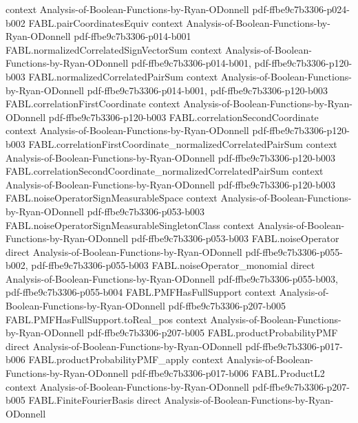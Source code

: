 \begin{theorem}
  {context}
  {Analysis-of-Boolean-Functions-by-Ryan-ODonnell}
  {pdf-ffbe9c7b3306-p024-b002}
\proofstep
  {FABL.pairCoordinatesEquiv}
  {context}
  {Analysis-of-Boolean-Functions-by-Ryan-ODonnell}
  {pdf-ffbe9c7b3306-p014-b001}
\proofstep
  {FABL.normalizedCorrelatedSignVectorSum}
  {context}
  {Analysis-of-Boolean-Functions-by-Ryan-ODonnell}
  {pdf-ffbe9c7b3306-p014-b001,
    pdf-ffbe9c7b3306-p120-b003}
\proofstep
  {FABL.normalizedCorrelatedPairSum}
  {context}
  {Analysis-of-Boolean-Functions-by-Ryan-ODonnell}
  {pdf-ffbe9c7b3306-p014-b001,
    pdf-ffbe9c7b3306-p120-b003}
\proofstep
  {FABL.correlationFirstCoordinate}
  {context}
  {Analysis-of-Boolean-Functions-by-Ryan-ODonnell}
  {pdf-ffbe9c7b3306-p120-b003}
\proofstep
  {FABL.correlationSecondCoordinate}
  {context}
  {Analysis-of-Boolean-Functions-by-Ryan-ODonnell}
  {pdf-ffbe9c7b3306-p120-b003}
\proofstep
  {FABL.correlationFirstCoordinate_normalizedCorrelatedPairSum}
  {context}
  {Analysis-of-Boolean-Functions-by-Ryan-ODonnell}
  {pdf-ffbe9c7b3306-p120-b003}
\proofstep
  {FABL.correlationSecondCoordinate_normalizedCorrelatedPairSum}
  {context}
  {Analysis-of-Boolean-Functions-by-Ryan-ODonnell}
  {pdf-ffbe9c7b3306-p120-b003}
\proofstep
  {FABL.noiseOperatorSignMeasurableSpace}
  {context}
  {Analysis-of-Boolean-Functions-by-Ryan-ODonnell}
  {pdf-ffbe9c7b3306-p053-b003}
\proofstep
  {FABL.noiseOperatorSignMeasurableSingletonClass}
  {context}
  {Analysis-of-Boolean-Functions-by-Ryan-ODonnell}
  {pdf-ffbe9c7b3306-p053-b003}
\proofstep
  {FABL.noiseOperator}
  {direct}
  {Analysis-of-Boolean-Functions-by-Ryan-ODonnell}
  {pdf-ffbe9c7b3306-p055-b002,
    pdf-ffbe9c7b3306-p055-b003}
\proofstep
  {FABL.noiseOperator_monomial}
  {direct}
  {Analysis-of-Boolean-Functions-by-Ryan-ODonnell}
  {pdf-ffbe9c7b3306-p055-b003,
    pdf-ffbe9c7b3306-p055-b004}
\proofstep
  {FABL.PMFHasFullSupport}
  {context}
  {Analysis-of-Boolean-Functions-by-Ryan-ODonnell}
  {pdf-ffbe9c7b3306-p207-b005}
\proofstep
  {FABL.PMFHasFullSupport.toReal_pos}
  {context}
  {Analysis-of-Boolean-Functions-by-Ryan-ODonnell}
  {pdf-ffbe9c7b3306-p207-b005}
\proofstep
  {FABL.productProbabilityPMF}
  {direct}
  {Analysis-of-Boolean-Functions-by-Ryan-ODonnell}
  {pdf-ffbe9c7b3306-p017-b006}
\proofstep
  {FABL.productProbabilityPMF_apply}
  {context}
  {Analysis-of-Boolean-Functions-by-Ryan-ODonnell}
  {pdf-ffbe9c7b3306-p017-b006}
\proofstep
  {FABL.ProductL2}
  {context}
  {Analysis-of-Boolean-Functions-by-Ryan-ODonnell}
  {pdf-ffbe9c7b3306-p207-b005}
\proofstep
  {FABL.FiniteFourierBasis}
  {direct}
  {Analysis-of-Boolean-Functions-by-Ryan-ODonnell}

\end{theorem}
